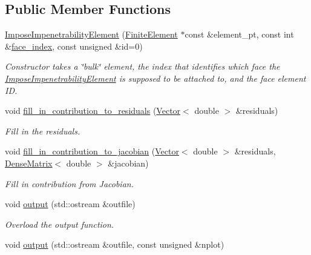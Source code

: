 \subsection*{Public Member Functions}
\begin{DoxyCompactItemize}
\item 
\hyperlink{classoomph_1_1ImposeImpenetrabilityElement_ae00b64597005a63ba62f7db13784a5fd}{Impose\+Impenetrability\+Element} (\hyperlink{classoomph_1_1FiniteElement}{Finite\+Element} $\ast$const \&element\+\_\+pt, const int \&\hyperlink{classoomph_1_1FaceElement_a478d577ac6db67ecc80f1f02ae3ab170}{face\+\_\+index}, const unsigned \&id=0)
\begin{DoxyCompactList}\small\item\em Constructor takes a \char`\"{}bulk\char`\"{} element, the index that identifies which face the \hyperlink{classoomph_1_1ImposeImpenetrabilityElement}{Impose\+Impenetrability\+Element} is supposed to be attached to, and the face element ID. \end{DoxyCompactList}\item 
void \hyperlink{classoomph_1_1ImposeImpenetrabilityElement_a1642298b1eca7806849324886672273e}{fill\+\_\+in\+\_\+contribution\+\_\+to\+\_\+residuals} (\hyperlink{classoomph_1_1Vector}{Vector}$<$ double $>$ \&residuals)
\begin{DoxyCompactList}\small\item\em Fill in the residuals. \end{DoxyCompactList}\item 
void \hyperlink{classoomph_1_1ImposeImpenetrabilityElement_a9a53b713347bdb2b9c04692ea708eb01}{fill\+\_\+in\+\_\+contribution\+\_\+to\+\_\+jacobian} (\hyperlink{classoomph_1_1Vector}{Vector}$<$ double $>$ \&residuals, \hyperlink{classoomph_1_1DenseMatrix}{Dense\+Matrix}$<$ double $>$ \&jacobian)
\begin{DoxyCompactList}\small\item\em Fill in contribution from Jacobian. \end{DoxyCompactList}\item 
void \hyperlink{classoomph_1_1ImposeImpenetrabilityElement_a44097c20f6a16ab6a8f60daeaba7aa7d}{output} (std\+::ostream \&outfile)
\begin{DoxyCompactList}\small\item\em Overload the output function. \end{DoxyCompactList}\item 
void \hyperlink{classoomph_1_1ImposeImpenetrabilityElement_ad23ac5158f42b7a6c65ec7cbd3deac44}{output} (std\+::ostream \&outfile, const unsigned \&nplot)

\end{DoxyCompactItemize}
